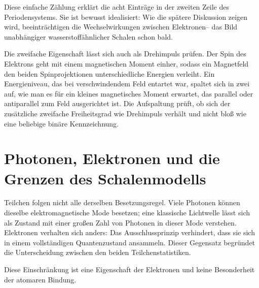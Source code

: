 Diese einfache Zählung erklärt die acht Einträge in der zweiten Zeile des Periodensystems. Sie ist bewusst idealisiert: Wie die spätere Diskussion zeigen wird, beeinträchtigen die Wechselwirkungen zwischen Elektronen-- das Bild unabhängiger wasserstoffähnlicher Schalen schon bald.

Die zweifache Eigenschaft lässt sich auch als Drehimpuls prüfen. Der Spin des Elektrons geht mit einem magnetischen Moment einher, sodass ein Magnetfeld den beiden Spinprojektionen unterschiedliche Energien verleiht. Ein Energieniveau, das bei verschwindendem Feld entartet war, spaltet sich in zwei auf, wie man es für ein kleines magnetisches Moment erwartet, das parallel oder antiparallel zum Feld ausgerichtet ist. Die Aufspaltung prüft, ob sich der zusätzliche zweifache Freiheitsgrad wie Drehimpuls verhält und nicht bloß wie eine beliebige binäre Kennzeichnung.

\section{Photonen, Elektronen und die Grenzen des Schalenmodells}

Teilchen folgen nicht alle derselben Besetzungsregel. Viele Photonen können dieselbe elektromagnetische Mode besetzen; eine klassische Lichtwelle lässt sich als Zustand mit einer großen Zahl von Photonen in dieser Mode verstehen. Elektronen verhalten sich anders: Das Ausschlussprinzip verhindert, dass sie sich in einem vollständigen Quantenzustand ansammeln. Dieser Gegensatz begründet die Unterscheidung zwischen den beiden Teilchenstatistiken.

\begin{classroomqa}
\end{classroomqa}

Diese Einschränkung ist eine Eigenschaft der Elektronen und keine Besonderheit der atomaren Bindung.

\begin{classroomqa}
\end{classroomqa}

